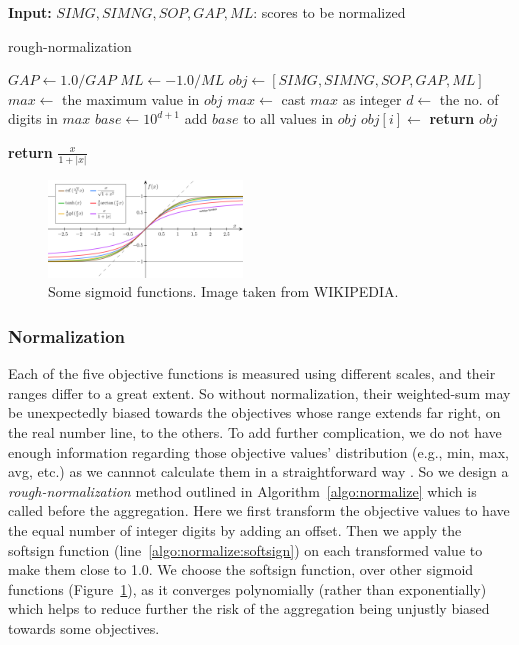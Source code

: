 \documentclass[a4paper,fleqn, review]{cas-dc}
\begin{document}
\begin{algorithm}[!htbp]\scriptsize
	\textbf{Input:} $SIMG, SIMNG, SOP, GAP, ML$: scores to be normalized
\begin{algorithmic}[1]
		\caption{rough-normalization}
		\label{algo:normalize}
		\State $GAP \gets 1.0/GAP$ 
		\State $ML \gets -1.0/ML$ 
		\State $ obj \gets [SIMG, SIMNG, SOP, GAP, ML]$
		\State $max \gets$ the maximum value in $obj$
		\State $max \gets$ cast $max$ as integer
		\State $d \gets$ the no. of digits in $max$
		\State $ base \gets 10^{d+1}$
		\State add $base$ to all values in $obj$
		\State $obj[i] \gets $ 
		\EndFor
		\State \textbf{return} $obj$
		\Statex

		 \label{algo:normalize:softsign}
		\State \textbf{return} $ \frac{x}{1 + |x|} $
		\EndFunction
	\end{algorithmic}
\end{algorithm}

\begin{figure}[!htbp]
	\centering
	\includegraphics[width=0.46\textwidth]{sigmoid}
	\caption{Some sigmoid functions. Image taken from WIKIPEDIA.}
	\label{fig:sigmoid}
\end{figure}

\subsubsection{Normalization}
Each of the five objective functions is measured using different scales, and their ranges differ to a great extent. So without normalization, their weighted-sum may be unexpectedly biased towards the objectives whose range extends far right, on the real number line, to the others. To add further complication, we do not have enough information regarding those objective values' distribution (e.g., min, max, avg, etc.) as we cannnot calculate them in a straightforward way . So we design a \textit{rough-normalization} method outlined in Algorithm~\ref{algo:normalize} which is called before the aggregation. Here we first transform the objective values to have the equal number of integer digits by adding an offset. Then we apply the softsign function (line~\ref{algo:normalize:softsign}) on each transformed value to make them close to 1.0. We choose the softsign function, over other sigmoid functions (Figure~\ref{fig:sigmoid}), as it converges polynomially (rather than exponentially) which helps to reduce further the risk of the aggregation being unjustly biased towards some objectives. 
\end{document}
